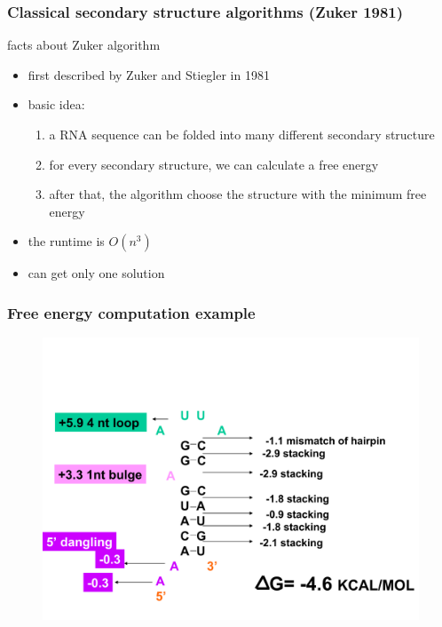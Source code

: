 \documentclass[ignorenonframetext,10pt]{beamer}
\begin{document}
\begin{frame}
\frametitle{\large Classical secondary structure algorithms (Zuker 1981)}
  \begin{block}{facts about Zuker algorithm}
    \begin{itemize}
    \item first described by Zuker and Stiegler in 1981
    \item basic idea: 
    \begin{enumerate}
      \item a RNA sequence can be folded into many different secondary structure
      \item for every secondary structure, we can calculate a free energy
      \item after that, the algorithm choose the structure with the minimum free energy
    \end{enumerate}
    \item the runtime is $O(n^3)$
    \item can get only one solution
    \end{itemize}
  \end{block}
\end{frame}


\begin{frame}
\frametitle{Free energy computation example}  
\begin{figure}
  \includegraphics[scale=0.4]{images/mfe_example.pdf} 
\end{figure}
\end{frame}
\end{document}
